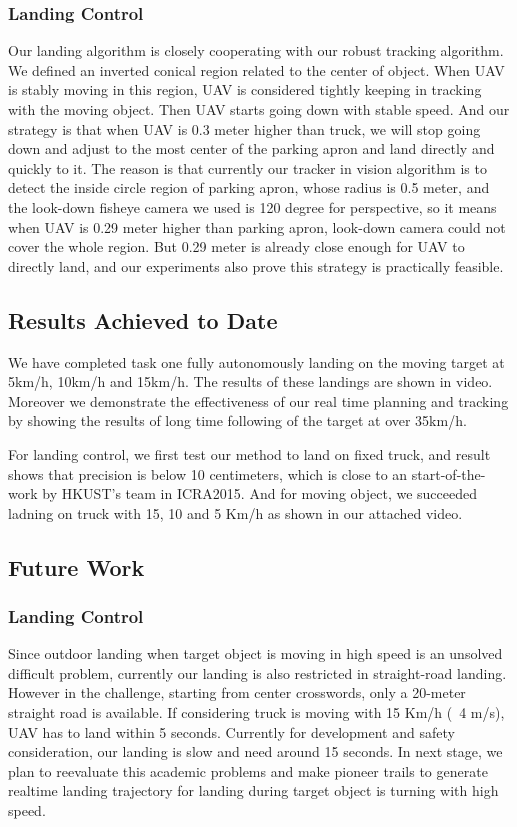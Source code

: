 \documentclass{standalone}
\begin{document}
\subsubsection{Landing Control}
Our landing algorithm is closely cooperating with our robust tracking algorithm. We defined an inverted conical region related to the center of object. When UAV is stably moving in this region, UAV is considered tightly keeping in tracking with the moving object. Then UAV starts going down with stable speed. And our strategy is that when UAV is 0.3 meter higher than truck, we will stop going down and adjust to the most center of the parking apron and land directly and quickly to it. The reason is that currently our tracker in vision algorithm is to detect the inside circle region of parking apron, whose radius is 0.5 meter, and the look-down fisheye camera we used is 120 degree for perspective, so it means when UAV is 0.29 meter higher than parking apron, look-down camera could not cover the whole region. But 0.29 meter is already close enough for UAV to directly land, and our experiments also prove this strategy is practically feasible.


\subsection{Results Achieved to Date}

We have completed task one fully autonomously landing on the moving
target at 5km/h, 10km/h and 15km/h. The results of these landings are
shown in video. Moreover we demonstrate the effectiveness of our real
time planning and tracking by showing the results of long time
following of the target at over 35km/h.

For landing control, we first test our method to land on fixed truck, and result shows that precision is below 10 centimeters, which is close to an start-of-the-work by HKUST's team in ICRA2015. And for moving object, we succeeded ladning on truck with 15, 10 and 5 Km/h as shown in our attached video.

\subsection{Future Work}
\subsubsection{Landing Control}
Since outdoor landing when target object is moving in high speed is an unsolved difficult problem, currently our landing is also restricted in straight-road landing. However in the challenge, starting from center crosswords, only a 20-meter straight road is available. If considering truck is moving with 15 Km/h (~4 m/s), UAV has to land within 5 seconds. Currently for development and safety consideration, our landing is slow and need around 15 seconds.
In next stage, we plan to reevaluate this academic problems and make pioneer trails to generate realtime landing trajectory for landing during target object is turning with high speed.
\end{document}
